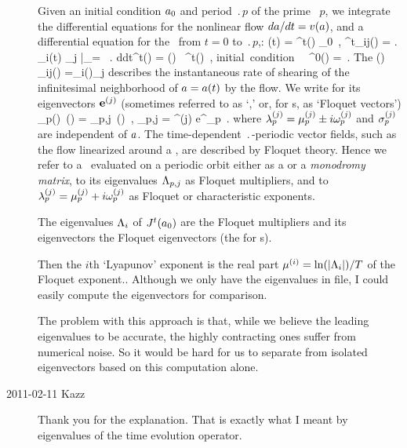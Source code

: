 \begin{description}
  Given an initial condition $\xInit$ and period $\period{p}$ of the prime
  \po\ $p$, we integrate
  the differential equations for the nonlinear flow
  $d\ssp/dt=v(\ssp)$, and a differential equation for the \jacobianM\
  from $t=0$ to $\period{p}$,:
  \beq
  \deltaX(t) = \jMps^t(\xInit) \deltaX_0
  \,, \qquad
  \jMps^t_{ij}(\xInit)
  =  \left. {\pde \ssp_i(t) \over \pde \ssp_j} \right|_{\ssp=\xInit}
  \, .
  \label{hOdes1}
  \eeq
  \beq
  {d\over dt}\jMps^t(\xInit)
  = {\Mvar}(\ssp) \, \jMps^t(\xInit)
  \,, \quad
  \mbox{initial condition~~} \jMps^0(\xInit) = \matId
  \,.
  The {\stabmat} (\velgradmat)
  \beq
  {\Mvar}_{ij}(\ssp) ={\pde \vel_i(\ssp)\over \pde \ssp_j  }
  describes the instantaneous rate of shearing of the infinitesimal
  neighborhood of $\ssp=\ssp(t)$
  by the flow.
  We write for its
  eigen\-vectors $\jEigvec[j]$
  (sometimes referred to as `{\cLvs},'
  or, for \po s, as `Floquet vectors')
  \beq
  \jMps_{p}(\ssp)\, \jEigvec[j](\ssp)
  = \ExpaEig_{p,j} \,\jEigvec[j] (\ssp)
  \,,\qquad
  \ExpaEig_{p,j}
  = ^{(j)} e^{\eigExp[j]_p  }
  \,.
  where $\eigExp[j]_p = \eigRe[j]_p \pm i\eigIm[j]_p$
  and $\sign{p}^{(j)}$ are independent of
  $\ssp$.
  The time-dependent
  $\period{}$-periodic vector fields, such
  as the flow linearized around a \po, are
  described by Floquet theory. Hence
  we refer to a \jacobianM\
  evaluated on a periodic orbit either as
  a {\em \FloquetM} or a {\em monodromy matrix}, to its
  eigenvalues
  $\ExpaEig_{p,j}$ as Floquet multipliers,
  and to $\eigExp[j]_p = \eigRe[j]_p+i\eigIm[j]_p$ as Floquet or
  characteristic exponents.



  The eigenvalues $\ExpaEig_i$ of $\jMps^t(\xInit)$ are
  the Floquet multipliers and its eigenvectors the Floquet eigenvectors
  (the {\cLvs} for \po s).

  Then the $i$th `Lyapunov' exponent is the real part
  $\eigRe[i] = \ln(|\ExpaEig_i|)/ T$ of the Floquet exponent..
  Although we only have the eigenvalues in file, I could easily compute
  the eigenvectors for comparison.

  The problem with this approach is that, while we believe the leading
  eigenvalues to be accurate, the highly contracting ones suffer from
  numerical noise. So it would be hard for us to separate {\entangled} from
  isolated eigenvectors based on this computation alone.


\item[2011-02-11 Kazz] Thank you for the explanation. That is exactly what
  I meant by eigenvalues of the time evolution operator.


\end{description}
